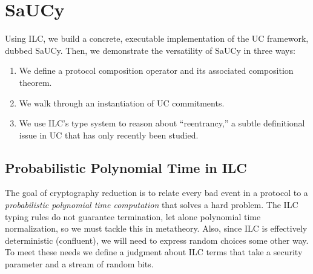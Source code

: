 \section{SaUCy}
\label{sec:saucy}

Using ILC, we build a concrete, executable implementation of the UC framework,
dubbed SaUCy. Then, we demonstrate the versatility of SaUCy in three ways:
\begin{enumerate}[leftmargin=*]
\item We define a protocol composition operator and its associated composition theorem.
\item We walk through an instantiation of UC commitments.
\item We use ILC's type system to reason about ``reentrancy,'' a subtle definitional issue in UC that has only recently been studied.
\end{enumerate}




\subsection{Probabilistic Polynomial Time in ILC}
\label{subsec:ppt}
The goal of cryptography reduction is to relate every bad event in a protocol to a \emph{probabilistic polynomial time computation} that solves a hard problem.
The ILC typing rules do not guarantee termination, let alone polynomial time normalization, so we must tackle this in metatheory.
Also, since ILC is effectively deterministic (confluent), we will need to express random choices some other way.
To meet these needs we define a judgment about ILC terms that take a security parameter and a  stream of random bits.

